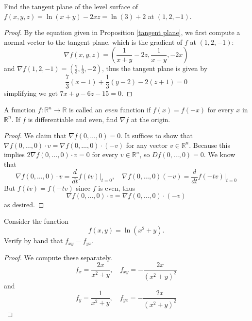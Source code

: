 \documentclass[openany]{book}
\newcommand{\R}{\mathbb{R}}
\begin{document}
\begin{prob}
    Find the tangent plane of the level surface of $f(x,y,z)=\ln(x+y)-2xz=\ln(3)+2$ at $(1,2,-1)$.
\end{prob}
\begin{proof}
    By the equation given in Proposition \ref{tangent plane}, we first compute a normal vector to the tangent plane, which is the gradient of $f$ at $(1,2,-1)$:
    \begin{equation*}
        \nabla f(x,y,z)=\left(\frac{1}{x+y}-2z, \frac{1}{x+y}, -2x\right)
    \end{equation*}
    and $\nabla f(1,2, -1)=\left(\frac{7}{3}, \frac{1}{3}, -2\right)$, thus the tangent plane is given by 
    \begin{equation*}
        \frac{7}{3}(x-1)+\frac{1}{3}(y-2)-2(z+1)=0
    \end{equation*}
    simplifying we get $7x+y-6z-15=0$.
\end{proof}


\begin{prob}
    A function $f\colon\R^n\to\R$ is called an \textit{even} function if $f(x)=f(-x)$ for every $x$ in $\R^n$. If $f$ is differentiable and even, find $\nabla f$ at the origin.
\end{prob}
\begin{proof}
    We claim that $\nabla f(0,\dots,0)=0$. It suffices to show that $\nabla f(0,\dots, 0)\cdot v=\nabla f(0, \dots, 0)\cdot (-v)$ for any vector $v\in\R^n$. Because this implies $2\nabla f(0,\dots, 0)\cdot v=0$ for every $v\in\R^n$, so $Df(0,\dots, 0)=0$.
    We know that
    \[\nabla f(0,\dots, 0)\cdot v=\frac d{dt}f(tv)\bigg|_{t=0}, \quad \nabla f(0,\dots, 0)(-v)=\frac d{dt}f(-tv)\bigg|_{t=0}\]
    But $f(tv)=f(-tv)$ since $f$ is even, thus 
    \begin{equation*}
        \nabla f(0,\dots, 0)\cdot v=\nabla f(0,\dots, 0)\cdot (-v)
    \end{equation*}
    as desired.
\end{proof}



\begin{prob}
    Consider the function
    \[f(x,y)={\ln(x^2+y)}.\]
    Verify by hand that $f_{xy}=f_{yx}$.
\end{prob}
\begin{proof}
    We compute these separately.
    \begin{equation*}
        f_x=\frac{2x}{x^2+y}, \quad f_{xy}=-\frac{2x}{\left(x^2+y\right)^2}
    \end{equation*}
    and 
    \begin{equation*}
        f_y=\frac1{x^2+y}, \quad f_{yx}=-\frac{2x}{\left(x^2+y\right)^2}
    \end{equation*}
\end{proof}
\end{document}
